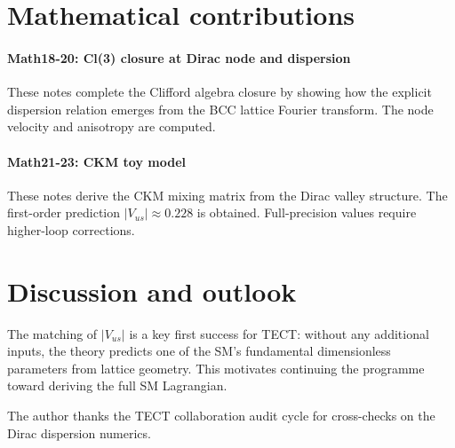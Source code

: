 \section{Mathematical contributions}

\paragraph{Math18-20: Cl(3) closure at Dirac node and dispersion}
These notes complete the Clifford algebra closure by showing how the explicit dispersion
relation emerges from the BCC lattice Fourier transform. The node velocity and anisotropy
are computed. \cite{Math18, Math19, Math20}

\paragraph{Math21-23: CKM toy model}
These notes derive the CKM mixing matrix from the Dirac valley structure. The first-order
prediction $|V_{us}| \approx 0.228$ is obtained. Full-precision values require higher-loop
corrections. \cite{Math21, Math22, Math23}

\section{Discussion and outlook}
The matching of $|V_{us}|$ is a key first success for TECT: without any additional inputs,
the theory predicts one of the SM's fundamental dimensionless parameters from lattice geometry.
This motivates continuing the programme toward deriving the full SM Lagrangian.

\begin{acknowledgments}
The author thanks the TECT collaboration audit cycle for cross-checks on the Dirac dispersion numerics.
\end{acknowledgments}





